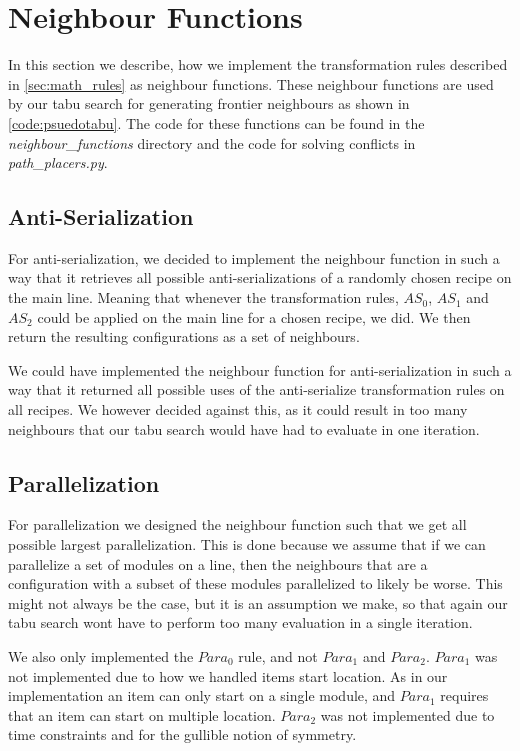 \section{Neighbour Functions}
In this section we describe, how we implement the transformation rules described in \cref{sec:math_rules} as neighbour functions. These neighbour functions are used by our tabu search for generating frontier neighbours as shown in \cref{code:psuedotabu}. The code for these functions can be found in the \textit{neighbour\_functions} directory and the code for solving conflicts in \textit{path\_placers.py}.


\subsection{Anti-Serialization}
For anti-serialization, we decided to implement the neighbour function in such a way that it retrieves all possible anti-serializations of a randomly chosen recipe on the main line. Meaning that whenever the transformation rules, $AS_0$, $AS_1$ and $AS_2$ could be applied on the main line for a chosen recipe, we did. We then return the resulting configurations as a set of neighbours.

We could have implemented the neighbour function for anti-serialization in such a way that it returned all possible uses of the anti-serialize transformation rules on all recipes. We however decided against this, as it could result in too many neighbours that our tabu search would have had to evaluate in one iteration.


\subsection{Parallelization}
For parallelization we designed the neighbour function such that we get all possible largest parallelization. This is done because we assume that if we can parallelize a set of modules on a line, then the neighbours that are a configuration with a subset of these modules parallelized to likely be worse. This might not always be the case, but it is an assumption we make, so that again our tabu search wont have to perform too many evaluation in a single iteration. 

We also only implemented the $Para_0$ rule, and not $Para_1$ and $Para_2$. $Para_1$ was not implemented due to how we handled items start location. As in our implementation an item can only start on a single module, and $Para_1$ requires that an item can start on multiple location. $Para_2$ was not implemented due to time constraints and for the gullible notion of symmetry.


